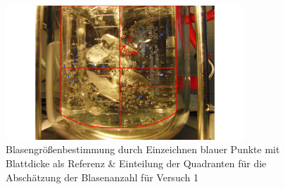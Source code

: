 \documentclass[12pt,liststotoc]{report}
\begin{document}
\begin{figure}[H]
    \centering
    \includegraphics[width=0.8\textwidth]{Blasenmessung/Blasengrose_Versuch_1.pdf}
    \caption[Blasengrößenbestimmung mit Einteilung der Quadranten für Versuch 1]{Blasengrößenbestimmung durch Einzeichnen blauer Punkte mit Blattdicke als Referenz \& Einteilung der Quadranten für die Abschätzung der Blasenanzahl für Versuch 1}
    \label{fig:Messung}
\end{figure}
\end{document}

